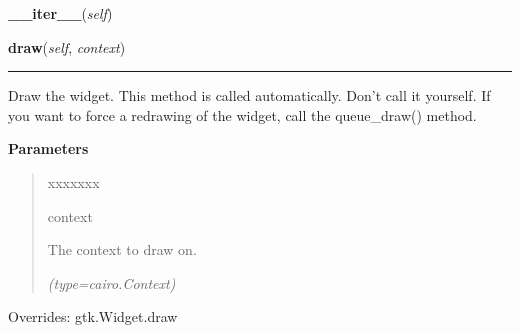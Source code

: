 \hspace{.8\funcindent}\begin{boxedminipage}{\funcwidth}

    \raggedright \textbf{\_\_iter\_\_}(\textit{self})

\setlength{\parskip}{2ex}
\setlength{\parskip}{1ex}
    \end{boxedminipage}

    \vspace{0.5ex}

\hspace{.8\funcindent}\begin{boxedminipage}{\funcwidth}

    \raggedright \textbf{draw}(\textit{self}, \textit{context})

    \vspace{-1.5ex}

    \rule{\textwidth}{0.5\fboxrule}
\setlength{\parskip}{2ex}
    Draw the widget. This method is called automatically. Don't call it 
    yourself. If you want to force a redrawing of the widget, call the 
    queue\_draw() method.

\setlength{\parskip}{1ex}
      \textbf{Parameters}
      \vspace{-1ex}

      \begin{quote}
        \begin{Ventry}{xxxxxxx}

          \item[context]

          The context to draw on.

            {\it (type=cairo.Context)}

        \end{Ventry}

      \end{quote}

      Overrides: gtk.Widget.draw

    \end{boxedminipage}

    \label{pygtk_chart:line_chart:LineChart:add_graph}

    \vspace{0.5ex}

